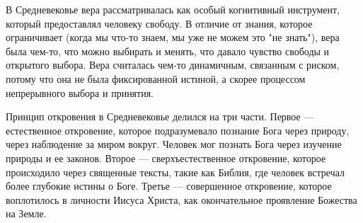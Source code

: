 
В Средневековье вера рассматривалась как особый когнитивный инструмент, который предоставлял человеку свободу. В отличие от знания, которое ограничивает (когда мы что-то знаем, мы уже не можем это "не знать"), вера была чем-то, что можно выбирать и менять, что давало чувство свободы и открытого выбора. Вера считалась чем-то динамичным, связанным с риском, потому что она не была фиксированной истиной, а скорее процессом непрерывного выбора и принятия.

Принцип откровения в Средневековье делился на три части. Первое — естественное откровение, которое подразумевало познание Бога через природу, через наблюдение за миром вокруг. Человек мог познать Бога через изучение природы и ее законов. Второе — сверхъестественное откровение, которое происходило через священные тексты, такие как Библия, где человек встречал более глубокие истины о Боге. Третье — совершенное откровение, которое воплотилось в личности Иисуса Христа, как окончательное проявление Божества на Земле.

